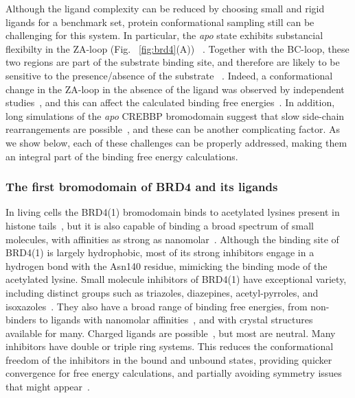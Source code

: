 \documentclass[aps,pre,twocolumn,nofootinbib,superscriptaddress,10pt, final,tightenlines]{revtex4-1}
\begin{document}
Although the ligand complexity can be reduced by choosing small and rigid ligands for a benchmark set, protein conformational sampling still can be challenging for this system.
In particular, the \emph{apo} state exhibits substancial flexibilty in the ZA-loop (Fig. ~\ref{fig:brd4}(A)) ~\cite{Su:2017:J.Biomol.Struct.Dyn., Steiner:2013:FEBSLett.}. 
Together with the BC-loop, these two regions are part of the substrate binding site, and therefore are likely to be sensitive to the presence/absence of the substrate ~\cite{Fill:2012:Bioorg.Med.Chem.}. 
Indeed, a conformational change in the ZA-loop in the absence of the ligand was observed by independent studies~\cite{Heinzelmann:2017:J.Chem.TheoryComput., Kuang:2015:J.Chem.Inf.Model., Steiner:2013:FEBSLett.}, and this can affect the calculated binding free energies~\cite{Heinzelmann:2017:J.Chem.TheoryComput.}. 
In addition, long simulations of the \emph{apo} CREBBP bromodomain suggest that slow side-chain rearrangements are possible~\cite{Steiner:2013:FEBSLett., Spilio:2014:Isr.J.Chem.}, and these can be another complicating factor. 
As we show below, each of these challenges can be properly addressed, making them an integral part of the binding free energy calculations.  


\subsubsection{The first bromodomain of BRD4 and its ligands}

In living cells the BRD4(1) bromodomain binds to acetylated lysines present in histone tails~\cite{Chung:2016:Prog.Med.Chem.}, but it is also capable of binding a broad spectrum of small molecules, with affinities as strong as nanomolar~\cite{Filippa:2014:Nat.Rev.DrugDiscov.}.
Although the binding site of BRD4(1) is largely hydrophobic, most of its strong inhibitors engage in a hydrogen bond with the Asn140 residue, mimicking the binding mode of the acetylated lysine. 
Small molecule inhibitors of BRD4(1) have exceptional variety, including distinct groups such as triazoles, diazepines, acetyl-pyrroles, and isoxazoles~\cite{Fill:2012:Bioorg.Med.Chem., Xue:2016:J.Med.Chem., Gehling:2013:ACSMed.Chem.Lett., Lucas:2013:Angew.Chem.Int.Ed.}. 
They also have a broad range of binding free energies, from non-binders to ligands with nanomolar affinities~\cite{Vidler:2013:J.Med.Chem.,Gehling:2013:ACSMed.Chem.Lett.}, and with crystal structures available for many. 
Charged ligands are possible~\cite{aldeghi_accurate_2016}, but most are neutral.
Many inhibitors have double or triple ring systems.  
This reduces the conformational freedom of the inhibitors in the bound and unbound states, providing quicker convergence for free energy calculations, and partially avoiding symmetry issues that might appear~\cite{mobley_use_2006}. 
\end{document}
